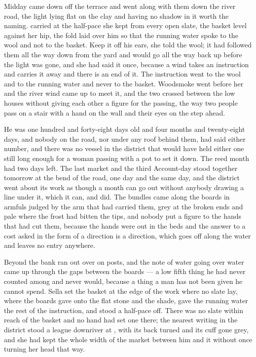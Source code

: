 Midday came down off the terrace and went along with them down the river road, the light lying flat on the clay and having no shadow in it worth the naming.  carried  at the half-pace she kept from every open slate, the basket level against her hip, the fold laid over him so that the running water spoke to the wool and not to the basket. Keep it off his ears, she told the wool; it had followed them all the way down from the yard and would go all the way back up before the light was gone, and she had said it once, because a wind takes an instruction and carries it away and there is an end of it. The instruction went to the wool and to the running water and never to the basket. Woodsmoke went before her and the river wind came up to meet it, and the two crossed between the low houses without giving each other a figure for the passing, the way two people pass on a stair with a hand on the wall and their eyes on the step ahead.

He was one hundred and forty-eight days old and four months and twenty-eight days, and nobody on the road, nor under any roof behind them, had said either number, and there was no vessel in the district that would have held either one still long enough for a woman passing with a pot to set it down. The reed month had two days left. The last market and the third Account-day stood together tomorrow at the bend of the road, one day and the same day, and the district went about its work as though a month can go out without anybody drawing a line under it, which it can, and did. The bundles came along the boards in armfuls judged by the arm that had carried them, grey at the broken ends and pale where the frost had bitten the tips, and nobody put a figure to the hands that had cut them, because the hands were out in the beds and the answer to a cost asked in the form of a direction is a direction, which goes off along the water and leaves no entry anywhere.

Beyond the bank  ran out over  on posts, and the note of water going over water came up through the gaps between the boards --- a low fifth thing he had never counted among  and never would, because a thing a man has not been given he cannot spend. Sella set the basket at the edge of the work where no slate lay, where the boards gave onto the flat stone and the shade, gave the running water the rest of the instruction, and stood a half-pace off. There was no slate within reach of the basket and no hand had set one there; the nearest writing in the district stood a league downriver at , with its back turned and its cuff gone grey, and she had kept the whole width of the market between him and it without once turning her head that way.

